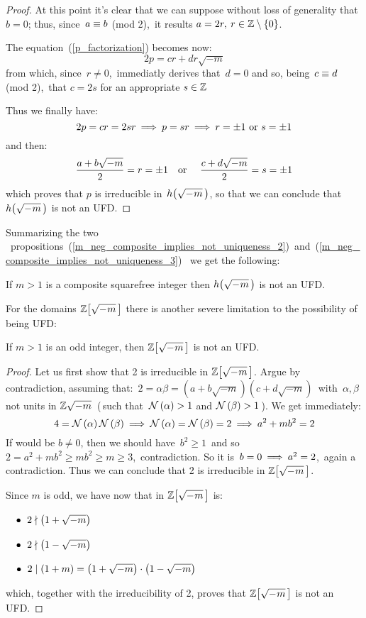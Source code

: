 \begin{proof}
At this point it's clear that we can suppose without loss
of generality that $b = 0$; thus, since\, $a \equiv b$
(mod 2),\, it results $a = 2r,\: r \in \mathbb{Z}\setminus\left\{0\right\}$.

The equation~(\ref{p_factorization}) becomes now:
$$
2p = cr + dr\sqrt{-m}
$$
from which, since\, $r \ne 0$,\, immediatly derives that\,
$d = 0$ and so, being\, $c \equiv d$ (mod 2),\,
that $c = 2s$ for an appropriate $s \in \mathbb{Z}$

Thus we finally have:
$$
2p = cr = 2sr \:\Longrightarrow\: p = sr \:\Longrightarrow\: r = \pm{1}\ \textrm{or}
\ s = \pm{1}
$$
and then:
$$
\frac{a + b\sqrt{-m}}{2} = r = \pm{1} \textrm{\quad or \quad}
\frac{c + d\sqrt{-m}}{2} = s = \pm{1}
$$
which proves that $p$ is irreducible in\, $\hhm{m}$, so that we
can conclude that $\hhm{m}$ is not an UFD.
%
\end{proof}

Summarizing the two \mbox{%
propositions
(\ref{m_neg_composite_implies_not_uniqueness_2})
and
(\ref{m_neg_composite_implies_not_uniqueness_3})%
} we get the following:

\begin{thm}\label{m_neg_composite_implies_not_uniqueness}
If $m > 1$ is a composite squarefree integer then $\hhm{m}$
is not an UFD.
\end{thm}

\medskip
For the domains $\ZZM{m}$ there is another severe limitation
to the possibility of being UFD:

\begin{thm}\label{m_neg_odd_implies_not_uniqueness_1}
If $m > 1$ is an  odd integer, then $\ZZM{m}$ is not an UFD.
\end{thm}

\begin{proof}
%
Let us first show that 2 is irreducible in $\ZZM{m}$.
Argue by contradiction, assuming that:\,
$2 = \alpha\beta = \left(a + b\sqrt{-m}\right)
\left(c + d\sqrt{-m}\right)$\, with\, $\alpha,\beta$\, not
units in $\mathbb{Z}{\sqrt{-m}}$\, (\,\ie such that\,
$\mathcal{N}\left(\alpha\right)>1$ and $\mathcal{N}\left(\beta\right)>1$\,).
We get immediately:
$$
4 = \mathcal{N}\left(\alpha\right)\mathcal{N}\left(\beta\right) \:\Longrightarrow\:
\mathcal{N}\left(\alpha\right) = \mathcal{N}\left(\beta\right) = 2 \:\Longrightarrow\:
a^2 + mb^2 = 2
$$
If would be $b \ne 0$, then we should have\, $b^2 \geq 1$\,
and so\, $2 = a^2 + mb^2 \geq mb^2 \geq m \geq 3$,\,
contradiction. So it is\, $b = 0 \:\Longrightarrow\: a^2 = 2$,\, again
a contradiction.
Thus we can conclude that 2 is irreducible in $\ZZM{m}$.

Since $m$ is odd, we have now that in $\ZZM{m}$ is:

~~$\bullet\ \; 2 \nmid \left(1 + \sqrt{-m}\right)$

~~$\bullet\ \; 2 \nmid \left(1 - \sqrt{-m}\right)$

~~$\bullet\ \; 2 \mid (1 + m) = 
\left(1 + \sqrt{-m}\right)\cdot\left(1 - \sqrt{-m}\right)$

which, together with the irreducibility of 2, proves that
$\ZZM{m}$ is not an UFD.
%
\end{proof}


